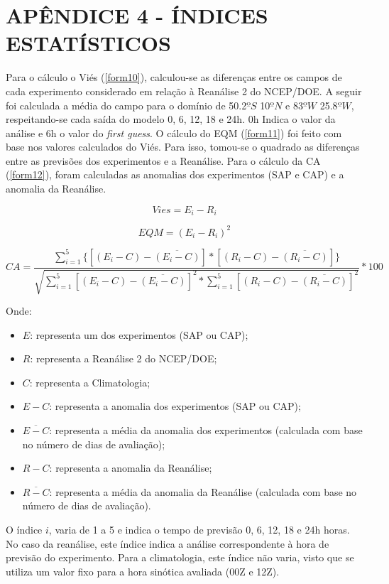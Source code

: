 \hypertarget{estilo:apendice4}{}

\chapter{APÊNDICE 4 - ÍNDICES ESTATÍSTICOS}
\label{apendice4}

Para o cálculo o Viés (\autoref{form10}), calculou-se as diferenças entre os campos de cada experimento considerado em relação à Reanálise 2 do NCEP/DOE. A seguir foi calculada a média do campo para o domínio de 50.2$ºS$ 10$ºN$ e 83$ºW$ 25.8$ºW$, respeitando-se cada saída do modelo 0, 6, 12, 18 e 24h. 0h Indica o valor da análise e 6h o valor do \textit{first guess}. O cálculo do EQM (\autoref{form11}) foi feito com base nos valores calculados do Viés. Para isso, tomou-se o quadrado as diferenças entre as previsões dos experimentos e a Reanálise. Para o cálculo da CA (\autoref{form12}), foram calculadas as anomalias dos experimentos (SAP e CAP) e a anomalia da Reanálise.

\begin{equation}
Vies=E_{i}-R_{i}
\label{form10}
\end{equation}

\begin{equation}
EQM=(E_{i}-R_{i})^{2}
\label{form11}
\end{equation}

\begin{equation}
CA=\frac{\sum_{i=1}^{5}\{[(E_{i}-C)-\overline{(E_{i}-C)}]*[(R_{i}-C)-\overline{(R_{i}-C)}]\}}{\sqrt{\sum_{i=1}^{5}[(E_{i}-C)-\overline{(E_{i}-C)}]^{2}*\sum_{i=1}^{5}[(R_{i}-C)-\overline{(R_{i}-C)}]^{2}}}*100
\label{form12}
\end{equation}

Onde:

\begin{itemize}
\item $E$: representa um dos experimentos (SAP ou CAP);
\item $R$: representa a Reanálise 2 do NCEP/DOE;
\item $C$: representa a Climatologia;
\item $E-C$: representa a anomalia dos experimentos (SAP ou CAP);
\item $\overline{E-C}$: representa a média da anomalia dos experimentos (calculada com base no número de dias de avaliação);
\item $R-C$: representa a anomalia da Reanálise;
\item $\overline{R-C}$: representa a média da anomalia da Reanálise (calculada com base no número de dias de avaliação).
\end{itemize}

O índice $i$, varia de 1 a 5 e indica o tempo de previsão 0, 6, 12, 18 e 24h horas. No caso da reanálise, este índice indica a análise correspondente à hora de previsão do experimento. Para a climatologia, este índice não varia, visto que se utiliza um valor fixo para a hora sinótica avaliada (00Z e 12Z).
